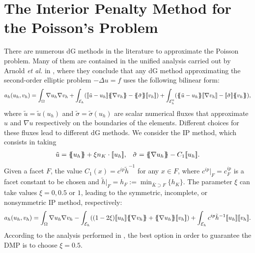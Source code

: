 \section{The Interior Penalty Method for the Poisson's Problem}\label{s-ip} There are numerous dG methods in the literature to approximate the Poisson problem. Many of them are contained in the unified analysis carried out by Arnold \emph{et al.} in \cite{arnold_unified_2002}, where they conclude that any dG method approximating the second-order elliptic problem $-\Delta u = f$ uses the following bilinear form:
\begin{align*}
a_h(u_h,v_h) = \int_\Omega  \nabla u_{h} \nabla v_{h} + \int_{\mathcal{E}_h} (\jump{\tilde{u}-u_h}\mean{ \nabla v_{h}} - \mean{\tilde{\sigma}} \jump{v_h}) + \int_{\mathcal{E}_h^0} (\mean{\tilde{u}-u_h}\jump{ \nabla v_{h}} - \jump{\tilde{\sigma}} \mean{v_h}),
\end{align*}
where $\tilde{u}=\tilde{u}(u_h)$ and $\tilde{\sigma}=\tilde{\sigma}(u_h)$ are  scalar numerical fluxes that approximate $u$ and $\nabla u$ respectively on the boundaries of the elements. Different choices for these fluxes lead to different dG methods. We consider the IP method, which consists in taking 
\begin{align*}
\tilde{u} = \mean{u_h} + \xi n_K\cdot\jump{u_h}, & &  \tilde{\sigma} = \mean{\nabla u_{h}} - C_1 \jump{u_h}.
\end{align*}
Given a facet $F$, the value $C_1(x)=c^{ip} \tilde{h}^{-1}$ for any $x \in F$, where $c^{ip}|_F=c^{ip}_F$ is a facet constant to be chosen and $\tilde{h}|_F = h_F := \min_{\bar{K} \supset F}\{h_K\}$. The parameter $\xi$ can take values $\xi=0,0.5$ or $1$, leading to the symmetric, incomplete, or nonsymmetric IP method, respectively:
\begin{align}\label{eq-muIP}
a_h(u_h,v_h) = \int_\Omega  \nabla u_{h} \nabla v_{h} - \int_{\mathcal{E}_h} ((1-2\xi)\jump{u_h}\mean{ \nabla v_{h}} + \mean{\nabla u_h} \jump{v_h}) +  \int_{\mathcal{E}_h}c^{ip} \tilde{h}^{-1} \jump{  u_{h}}\jump{  v_{h}}.
\end{align}
 According to the analysis performed in \cite{horvath_discrete_2013}, the best option in order to guarantee the DMP is to choose $\xi = 0.5$. %
 
